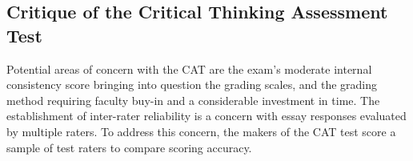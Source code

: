 \subsection{Critique of the Critical Thinking Assessment Test}

Potential areas of concern with the CAT are the exam’s moderate internal consistency score bringing into question the grading scales, and the grading method requiring faculty buy-in and a considerable investment in time. The establishment of inter-rater reliability is a concern with essay responses evaluated by multiple raters.  To address this concern, the makers of the CAT test score a sample of test raters to compare scoring accuracy.